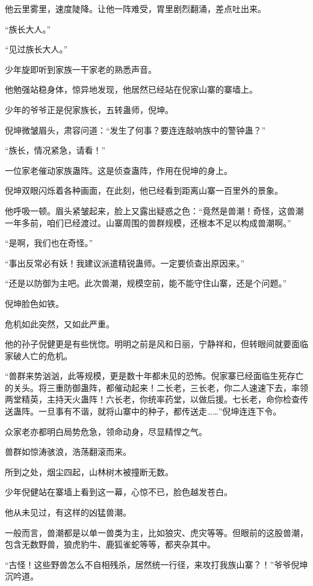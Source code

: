 \begin{this_body}
他云里雾里，速度陡降。让他一阵难受，胃里剧烈翻涌，差点吐出来。

“族长大人。”

“见过族长大人。”

少年旋即听到家族一干家老的熟悉声音。

他勉强站稳身体，惊异地发现，他居然已经站在倪家山寨的寨墙上。

少年的爷爷正是倪家族长，五转蛊师，倪坤。

倪坤微皱眉头，肃容问道：“发生了何事？要连连敲响族中的警钟蛊？”

“族长，情况紧急，请看！”

一位家老催动家族蛊阵。这是侦查蛊阵，作用在倪坤的身上。

倪坤双眼闪烁着各种画面，在此刻，他已经看到距离山寨一百里外的景象。

他呼吸一顿。眉头紧皱起来，脸上又露出疑惑之色：“竟然是兽潮！奇怪，这兽潮一年多前，咱们已经渡过。山寨周围的兽群规模，还根本不足以构成兽潮啊。”

“是啊，我们也在奇怪。”

“事出反常必有妖！我建议派遣精锐蛊师。一定要侦查出原因来。”

“还是以防御为主吧。此次兽潮，规模空前，能不能守住山寨，还是个问题。”

倪坤脸色如铁。

危机如此突然，又如此严重。

他的孙子倪健更是有些恍惚。明明之前是风和日丽，宁静祥和，但转眼间就要面临家破人亡的危机。

“兽群来势汹汹，此等规模，更是数十年都未见的恐怖。倪家寨已经面临生死存亡的关头。将三重防御蛊阵，都催动起来！二长老，三长老，你二人速速下去，率领两堂精英，主持天火蛊阵！六长老，你统率药堂，以做后援。七长老，命你检查传送蛊阵。一旦事有不谐，就将山寨中的种子，都传送走……”倪坤连连下令。

众家老亦都明白局势危急，领命动身，尽显精悍之气。

兽群如惊涛骇浪，浩荡翻滚而来。

所到之处，烟尘四起，山林树木被撞断无数。

少年倪健站在寨墙上看到这一幕，心惊不已，脸色越发苍白。

他从未见过，有这样的凶猛兽潮。

一般而言，兽潮都是以单一兽类为主，比如狼灾、虎灾等等。但眼前的这股兽潮，包含无数野兽，狼虎豹牛、鹿狐雀蛇等等，都夹杂其中。

“古怪！这些野兽怎么不自相残杀，居然统一行径，来攻打我族山寨？！”爷爷倪坤沉吟道。


\end{this_body}
